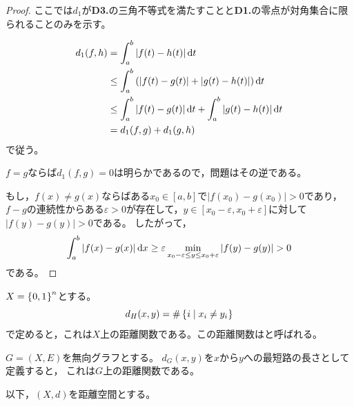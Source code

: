 \documentclass{jsarticle}
\begin{document}
\begin{proof}
    ここでは$d_{1}$が{\bf D3.}の三角不等式を満たすことと{\bf D1.}の零点が対角集合に限られることのみを示す。

    \begin{align*}
        d_{1} (f,h)
        &= \int_{a}^{b} \left| f(t) - h(t) \right| \mathrm{d}t \\
      &\le \int_{a}^{b} \left( \left| f(t) - g(t) \right| + \left| g(t) - h(t) \right| \right) \mathrm{d}t \\
      &\le \int_{a}^{b} \left| f(t) - g(t) \right| \mathrm{d}t +  \int_{a}^{b} \left| g(t) - h(t) \right| \mathrm{d}t \\
        &= d_{1} (f,g) + d_{1} (g,h)
    \end{align*}
    で従う。


    $f = g$ならば$d_{1} (f,g) = 0$は明らかであるので，問題はその逆である。

    もし，$f(x) \neq g(x)$ならばある$x_{0} \in [a,b]$で$\left| f(x_{0}) - g(x_{0}) \right|> 0$であり，
    $f-g$の連続性からある$\varepsilon > 0$が存在して，$y \in [x_{0} - \varepsilon, x_{0} + \varepsilon]$に対して
    $\left| f(y) - g(y) \right| > 0$である。
    したがって，
    \begin{equation*}
        \int_{a}^{b} \left| f(x) - g(x) \right| \mathrm{d}x \ge \varepsilon \min_{x_{0} - \varepsilon \le y \le x_{0} + \varepsilon} \left| f(y) - g(y) \right| > 0
    \end{equation*}
    である。
\end{proof}

\begin{rei}
    $X = \Set{\hspace{-1.8pt} 0,1 \hspace{-1.8pt}}^{n}$とする。
    \begin{equation}
        d_{H}(x,y) = \# \Set{\hspace{-1.8pt} i | x_{i} \neq y_{i} \hspace{-1.8pt}}
    \end{equation}
    で定めると，これは$X$上の距離関数である。この距離関数はと呼ばれる。
\end{rei}


\begin{rei}
    $G = (X,E)$を無向グラフとする。
    $d_{G}(x,y)$を$x$から$y$への最短路の長さとして定義すると，
    これは$G$上の距離関数である。
\end{rei}

以下，$(X,d)$を距離空間とする。
\end{document}
